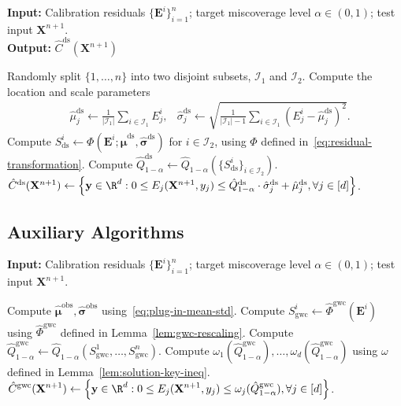 \begin{algorithm}[!htb]
    \caption{Standardization with Data Splitting}
    \label{alg:std-ds}
    \textbf{Input:} Calibration residuals $\{\mathbf{E}^i\}_{i=1}^{n}$; target miscoverage level $\alpha\in(0,1)$; test input $\mathbf{X}^{n+1}$.\\
    \textbf{Output:} $\hat{C}^{\mathrm{ds}}(\mathbf{X}^{n+1})$
    \begin{algorithmic}[1]
        \State Randomly split $\{1,\ldots,n\}$ into two disjoint subsets, $\mathcal{I}_1$ and $\mathcal{I}_2$.
            \State Compute the location and scale parameters
            \begin{align*}
            & \hat{\mu}^{\mathrm{ds}}_j \gets \frac{1}{|\mathcal{I}_1|}\sum_{i \in \mathcal I_1}E^i_j,
              & \hat{\sigma}^{\mathrm{ds}}_j \gets \sqrt{\frac{1}{|\mathcal I_1|-1}\sum_{i \in \mathcal I_1}(E^i_j-\hat{\mu}^{\mathrm{ds}}_j)^2}.
            \end{align*}
        \EndFor
        \State Compute $S^i_{\mathrm{ds}} \gets \Phi(\mathbf{E}^i; \hat{\boldsymbol\mu}^{\mathrm{ds}},\hat{\boldsymbol\sigma}^{\mathrm{ds}})$ for $i \in \mathcal I_2$, using $\Phi$ defined in~\eqref{eq:residual-transformation}.
        \State Compute $\hat{Q}^\mathrm{ds}_{1-\alpha}\gets \hat{Q}_{1-\alpha}(\{S^i_\mathrm{ds}\}_{i \in \mathcal{I}_2}).$
        \State \Return $\hat{C}^{\mathrm{ds}}(\mathbf{X}^{n+1}) \gets \left\{\mathbf y \in \R^d: 0 \leq E_j(\mathbf{X}^{n+1}, y_j) \leq \hat{Q}^\mathrm{ds}_{1-\alpha}\cdot \hat{\sigma}^\mathrm{ds}_j + \hat{\mu}^\mathrm{ds}_j, \forall j \in [d]\right\}$.
    \end{algorithmic}
\end{algorithm}

\FloatBarrier

\subsection{Auxiliary Algorithms}

\begin{algorithm}[!htb]
\caption{Global-Worst-Case TSCP (TSCP-GWC)}
\label{alg:global}
\textbf{Input:} Calibration residuals $\{\mathbf{E}^i\}_{i=1}^{n}$; target miscoverage level $\alpha\in(0,1)$; test input $\mathbf{X}^{n+1}$.
\begin{algorithmic}[1]
\State Compute $\hat{\boldsymbol\mu}^{\mathrm{obs}}, \hat{\boldsymbol\sigma}^{\mathrm{obs}}$ using~\eqref{eq:plug-in-mean-std}.
\State Compute $S^i_{\mathrm{gwc}}\gets \hat{\Phi}^{\mathrm{gwc}}(\mathbf{E}^i)$ using $\hat{\Phi}^{\mathrm{gwc}}$ defined in Lemma~\ref{lem:gwc-rescaling}.
\State Compute $\hat{Q}^{\mathrm{gwc}}_{1-\alpha} \gets \hat{Q}_{1-\alpha}(S^1_{\mathrm{gwc}},\dots, S^n_{\mathrm{gwc}})$.
\State Compute $\omega_1(\hat{Q}^{\mathrm{gwc}}_{1-\alpha}),\ldots,\omega_d(\hat{Q}^{\mathrm{gwc}}_{1-\alpha})$ using $\omega$ defined in Lemma~\ref{lem:solution-key-ineq}.
\State \Return $\displaystyle \hat{C}^{\mathrm{gwc}}(\mathbf{X}^{n+1}) \gets \left\{\mathbf y\in \R^d: 0\leq E_j(\mathbf{X}^{n+1}, y_j) \leq  \omega_j(\hat{Q}^{\mathrm{gwc}}_{1-\alpha}), \forall j \in [d]\right\}$.
\end{algorithmic} 
\end{algorithm}

